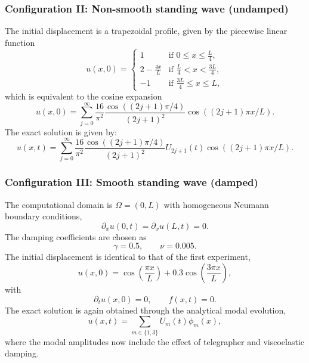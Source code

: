 \documentclass{Configuration_Files/PoliMi3i_thesis}
\begin{document}
\subsubsection{Configuration II: Non-smooth standing wave (undamped)}
The initial displacement is a trapezoidal profile, given by the piecewise linear function
\[
u(x,0) = 
\begin{cases}
1 & \text{if } 0 \le x \le \frac{L}{4}, \\[4pt]
2 - \frac{4x}{L} & \text{if } \frac{L}{4} < x < \frac{3L}{4}, \\[4pt]
-1 & \text{if } \frac{3L}{4} \le x \le L,
\end{cases}
\]
which is equivalent to the cosine expansion
\[
u(x,0)
=
\sum_{j=0}^{\infty}
\frac{16}{\pi^2} \frac{\cos\left((2j+1)\pi/4\right)}{(2j+1)^2}
\cos\left((2j+1)\pi x/L\right).
\]
The exact solution is given by:
\[
u(x,t)
=
\sum_{j=0}^{\infty}
\frac{16}{\pi^2} \frac{\cos\left((2j+1)\pi/4\right)}{(2j+1)^2}
U_{2j+1}(t)\cos\left((2j+1)\pi x/L\right).
\]

\subsubsection{Configuration III: Smooth standing wave (damped)}
The computational domain is $\Omega=(0,L)$ with homogeneous Neumann boundary conditions,
\[
\partial_xu(0,t)=\partial_xu(L,t)=0.
\]
The damping coefficients are chosen as
\[
\gamma=0.5,
\qquad
\nu=0.005.
\]
The initial displacement is identical to that of the first experiment,
\[
u(x,0)
=
\cos\!\left(\frac{\pi x}{L}\right)
+
0.3\cos\!\left(\frac{3\pi x}{L}\right),
\]
with
\[
\partial_tu(x,0)=0,
\qquad
f(x,t)=0.
\]
The exact solution is again obtained through the analytical modal evolution,
\[
u(x,t)
=
\sum_{m\in\{1,3\}}
U_m(t)\phi_m(x),
\]
where the modal amplitudes now include the effect of telegrapher and viscoelastic damping.
\end{document}
